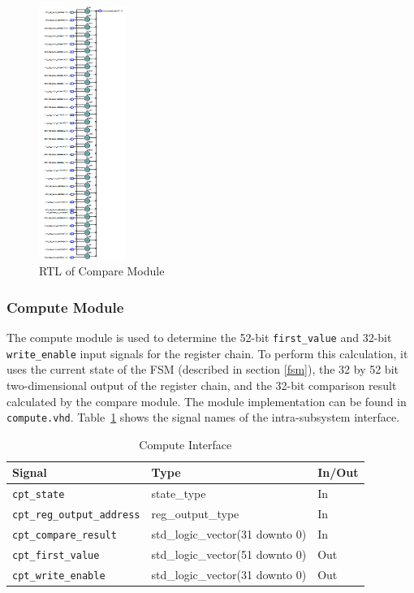 \documentclass{article}
\begin{document}
\begin{figure}[ht!]
  \centering
    \includegraphics[width=0.25\textwidth]{compare_rtl.PNG}
  \caption{RTL of Compare Module}
  \label{fig:compare-rtl}
\end{figure}

\newpage
\subsubsection{Compute Module}

The compute module is used to determine the 52-bit \texttt{first\_value} and 32-bit \texttt{write\_enable} input signals for the register chain. To perform this calculation, it uses the current state of the FSM (described in section \ref{fsm}), the 32 by 52 bit two-dimensional output of the register chain, and the 32-bit comparison result calculated by the compare module. The module implementation can be found in \texttt{compute.vhd}. Table~\ref{tab:compute} shows the signal names of the intra-subsystem interface. 

\begin{table}[ht]
    \begin{center}
        \begin{tabular}{lll}\hline
        Signal & Type & In/Out \\
        \hline
        \texttt{cpt\_state} & state\_type & In \\
        \hline
        \texttt{cpt\_reg\_output\_address} & reg\_output\_type & In \\
        \hline
        \texttt{cpt\_compare\_result} & std\_logic\_vector(31 downto 0) & In \\
        \hline
        \texttt{cpt\_first\_value} & std\_logic\_vector(51 downto 0) & Out \\
        \hline
        \texttt{cpt\_write\_enable} & std\_logic\_vector(31 downto 0) & Out \\
        \hline
        \end{tabular}
        \caption{Compute Interface}\label{tab:compute}
    \end{center}
\end{table}
\end{document}
